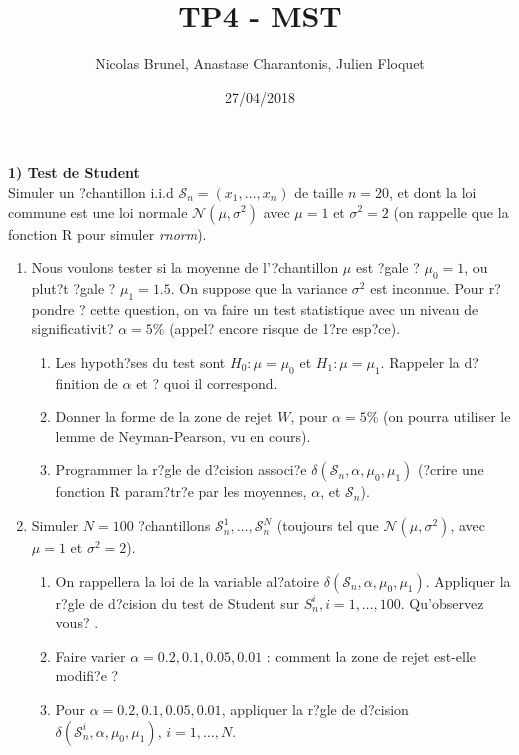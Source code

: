 \documentclass{article} %
\title{TP4 - MST}
\author{Nicolas Brunel, Anastase Charantonis, Julien Floquet}
\date{27/04/2018}
\begin{document}
 
\maketitle
\textbf{1) Test de Student}\\
Simuler un ?chantillon i.i.d $\mathcal{S}_n=(x_1,\dots,x_n)$ de taille $n=20$, et dont la loi commune est une loi normale $\mathcal{N}(\mu,\sigma^2)$  avec $\mu = 1$ et $\sigma^2 = 2$ (on rappelle que la fonction R pour simuler \emph{rnorm}). 
\\

\begin{enumerate}

\item Nous voulons tester si la moyenne de l'?chantillon $\mu$ est ?gale ? $\mu_0=1$, ou plut?t ?gale ? $\mu_1 = 1.5$. On suppose que la variance  $\sigma^2$ est inconnue. Pour r?pondre ? cette question, on va faire un test statistique avec un niveau de significativit? $\alpha = 5 \%$ (appel? encore risque de 1?re esp?ce).
\begin{enumerate}
\item Les hypoth?ses du test sont  $H_0 : \mu = \mu_0 $ et $H_1 : \mu = \mu_1$. Rappeler la d?finition de $\alpha$ et ? quoi il correspond. 
\item Donner la forme de la zone de rejet $W$, pour $\alpha=5\%$ (on pourra utiliser le lemme de Neyman-Pearson, vu en cours). 
\item Programmer la r?gle de d?cision associ?e $\delta(\mathcal{S}_n,\alpha,\mu_0,\mu_1)$ (?crire une fonction R param?tr?e par les moyennes, $\alpha$, et $\mathcal{S}_n$).  
\end{enumerate}

\item Simuler $N=100$ ?chantillons $\mathcal{S}^1_n, \dots, \mathcal{S}^N_n$ (toujours tel que $\mathcal{N}(\mu,\sigma^2)$, avec $\mu = 1$ et $\sigma^2 = 2$). 
\begin{enumerate}
\item On rappellera la loi de la variable al?atoire $\delta(\mathcal{S}_n,\alpha,\mu_0,\mu_1)$.  Appliquer la r?gle de d?cision du test de Student sur $S_n^i, i=1,\dots,100$. Qu'observez vous? .
\item Faire varier $\alpha=0.2, 0.1, 0.05, 0.01$ : comment la zone de rejet est-elle modifi?e ?
\item Pour $\alpha=0.2, 0.1, 0.05, 0.01$, appliquer la r?gle de d?cision $\delta(\mathcal{S}^i_n,\alpha,\mu_0,\mu_1)$, $i=1,\dots,N$.
\end{enumerate}


\end{enumerate}
\end{document}
